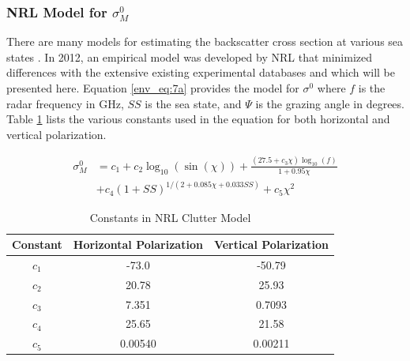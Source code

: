 \subsubsection{NRL Model for $\sigma_M^0$}
There are many models for estimating the backscatter cross section at various sea states \cite{blake_radar} \cite{richards_radar} \cite{nathanson_radar}. In 2012, an empirical model was developed by NRL that minimized differences with the extensive existing experimental databases \cite{gregers-hansen_clutter} and which will be presented here. Equation \ref{env_eq:7a} provides the model for $\sigma^0$ where $f$ is the radar frequency in GHz, $SS$ is the sea state, and $\Psi$ is the grazing angle in degrees. Table \ref{env_tab:0} lists the various constants used in the equation for both horizontal and vertical polarization.

\begin{equation}
\begin{aligned}
  \sigma_M^0 &= c_1 + c_2 \log_{10}(\sin(\chi))+\frac{\left(27.5 + c_3\chi\right)\log_{10}(f)}{1+0.95\chi}\\
  &+c_4\left(1 + SS \right)^{1/\left(2+0.085\chi + 0.033SS\right)}
 + c_5\chi^2 
 \end{aligned}
 \label{env_eq:7a}
  \end{equation}
  \renewcommand{\baselinestretch}{2} \small\normalsize
  
  \begin{table}[H]
  \begin{center}
      \renewcommand{\baselinestretch}{1} \small\normalsize
  \begin{quote}
    \caption[Constants in NRL Clutter Model]{Constants in NRL Clutter Model\label{env_tab:0}}
  \end{quote}
  \begin{tabular} {|c | c | c|}
    \hline
  \bf{Constant} & \bf{Horizontal Polarization} & \bf{Vertical Polarization} \\ \hline
  $c_1$ & -73.0 & -50.79  \\ \hline
  $c_2$ & 20.78 & 25.93  \\ \hline
  $c_3$ & 7.351 & 0.7093 \\ \hline
  $c_4$ & 25.65 & 21.58  \\ \hline
  $c_5$ & 0.00540 & 0.00211 \\ \hline
\end{tabular}
\end{center}
\end{table}
\renewcommand{\baselinestretch}{2} \small\normalsize
  
